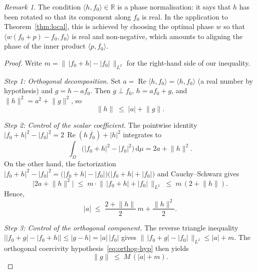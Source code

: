 \documentclass[11pt]{amsart}
\theoremstyle{remark}
\newtheorem{remark}[theorem]{Remark}
\begin{document}
\begin{remark}
The condition $\langle h,f_0\rangle \in \mathbb{R}$ is a phase normalisation: it says that
$h$ has been rotated so that its component along $f_0$ is real.  In the
application to Theorem~\ref{thm:local}, this is achieved by choosing the
optimal phase $w$ so that $\langle w(f_0 + p) - f_0,f_0\rangle$ is real and
non-negative, which amounts to aligning the phase of the inner product
$\langle p,f_0\rangle$.
\end{remark}

\begin{proof}
Write $m = \bigl\|\, \lvert f_0 + h \rvert - \lvert f_0 \rvert \,\bigr\|_{L^2}$ for the right-hand side of our inequality.

\medskip
\noindent
\emph{Step 1: Orthogonal decomposition.}\;
Set $a = \operatorname{Re}\langle h,f_0\rangle = \langle h,f_0\rangle$ (a real number by hypothesis) and
$g = h - a f_0$.  Then $g \perp f_0$, $h = af_0 + g$, and
$\lVert h \rVert^2 = a^2 + \lVert g \rVert^2$, so
\begin{equation}\label{eq:triangle}
\lVert h \rVert \;\le\; \lvert a \rvert + \lVert g \rVert.
\end{equation}

\medskip
\noindent
\emph{Step 2: Control of the scalar coefficient.}\;
The pointwise identity
$\lvert f_0 + h \rvert^2 - \lvert f_0 \rvert^2
= 2\,\operatorname{Re}(h\,\overline{f_0}) + \lvert h \rvert^2$
integrates to
\[
\int_\Omega \bigl(\lvert f_0 + h \rvert^2 - \lvert f_0 \rvert^2\bigr)\,\mathrm{d}\mu
= 2a + \lVert h \rVert^2.
\]
On the other hand, the factorization
$\lvert f_0 + h \rvert^2 - \lvert f_0 \rvert^2
= \bigl(\lvert f_0 + h \rvert - \lvert f_0 \rvert\bigr)
  \bigl(\lvert f_0 + h \rvert + \lvert f_0 \rvert\bigr)$
and Cauchy--Schwarz gives
\[
\lvert 2a + \lVert h \rVert^2 \rvert
\;\le\;
m \cdot \bigl\|\, \lvert f_0 + h \rvert + \lvert f_0 \rvert \,\bigr\|_{L^2}
\;\le\;
m\,(2 + \lVert h \rVert).
\]
Hence,
\begin{equation}\label{eq:a-bound}
\lvert a \rvert
\;\le\;
\frac{2 + \lVert h \rVert}{2}\, m
+ \frac{\lVert h \rVert^2}{2}.
\end{equation}

\medskip
\noindent
\emph{Step 3: Control of the orthogonal component.}\;
The reverse triangle inequality
$\bigl\lvert \lvert f_0 + g \rvert - \lvert f_0 + h \rvert \bigr\rvert
\le \lvert g - h \rvert = \lvert a \rvert\,\lvert f_0 \rvert$
gives
$\bigl\|\, \lvert f_0 + g \rvert - \lvert f_0 \rvert \,\bigr\|_{L^2}
\le \lvert a \rvert + m$.
The orthogonal coercivity hypothesis~\eqref{eq:orthog-hyp} then yields
\begin{equation}\label{eq:g-bound}
\lVert g \rVert \;\le\; M\,(\lvert a \rvert + m).
\end{equation}


\end{proof}
\end{document}
